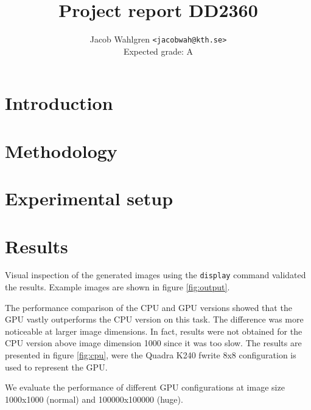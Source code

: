 \documentclass{article}
\title{Project report DD2360}
\author{Jacob Wahlgren \texttt{<jacobwah@kth.se>} \\ Expected grade: A}
\begin{document}
\maketitle

\section{Introduction}
%
\section{Methodology}

\section{Experimental setup}

\section{Results}

Visual inspection of the generated images using the \verb|display| command
validated the results. Example images are shown in figure \ref{fig:output}.

The performance comparison of the CPU and GPU versions showed that the GPU
vastly outperforms the CPU version on this task. The difference was more
noticeable at larger image dimensions. In fact, results were not obtained for
the CPU version above image dimension 1000 since it was too slow. The results
are presented in figure \ref{fig:cpu}, were the Quadra K240 fwrite 8x8
configuration is used to represent the GPU.

We evaluate the performance of different GPU configurations at image size
1000x1000 (normal) and 100000x100000 (huge).
\end{document}
